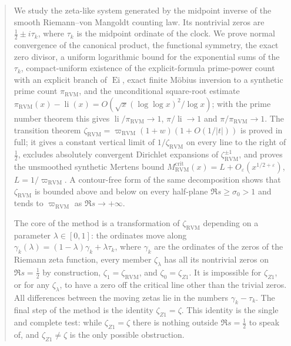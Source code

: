 \documentclass[11pt,reqno]{amsart}
\numberwithin{equation}{section}
\theoremstyle{plain}
\theoremstyle{definition}
\theoremstyle{remark}
\newcommand{\eps}{\varepsilon}
\newcommand{\li}{\operatorname{li}}
\newcommand{\Ei}{\operatorname{Ei}}
\newcommand{\RVM}{\mathrm{RVM}}
\newcommand{\crit}{\mathrm{crit}}
\begin{document}
\begin{abstract}
We study the zeta-like system generated by the midpoint inverse of the smooth Riemann--von Mangoldt counting law.  Its nontrivial zeros are $\tfrac12\pm i\tau_k$, where $\tau_k$ is the midpoint ordinate of the clock.  We prove normal convergence of the canonical product, the functional symmetry, the exact zero divisor, a uniform logarithmic bound for the exponential sums of the $\tau_k$, compact-uniform existence of the explicit-formula prime-power count with an explicit branch of $\Ei$, exact finite M\"obius inversion to a synthetic prime count $\pi_{\RVM}$, and the unconditional square-root estimate $\pi_{\RVM}(x)-\li(x)=O(\sqrt x(\log\log x)^2/\log x)$; with the prime number theorem this gives $\li/\pi_{\RVM}\to1$, $\pi/\li\to1$ and $\pi/\pi_{\RVM}\to1$.  The transition theorem $\zeta_{\RVM}=\varpi_{\RVM}(1+w)(1+O(1/|t|))$ is proved in full; it gives a constant vertical limit of $1/\zeta_{\RVM}$ on every line to the right of $\tfrac12$, excludes absolutely convergent Dirichlet expansions of $\zeta_{\RVM}^{\pm1}$, and proves the unsmoothed synthetic Mertens bound $M_{\RVM}^{\crit}(x)=L+O_\eps(x^{1/2+\eps})$, $L=1/\varpi_{\RVM}$.  A contour-free form of the same decomposition shows that $\zeta_{\RVM}$ is bounded above and below on every half-plane $\Re s\ge\sigma_0>1$ and tends to $\varpi_{\RVM}$ as $\Re s\to+\infty$.

The core of the method is a transformation of $\zeta_{\RVM}$ depending on a parameter $\lambda\in[0,1]$: the ordinates move along $\gamma_k(\lambda)=(1-\lambda)\gamma_k+\lambda\tau_k$, where $\gamma_k$ are the ordinates of the zeros of the Riemann zeta function, every member $\zeta_\lambda$ has all its nontrivial zeros on $\Re s=\tfrac12$ by construction, $\zeta_1=\zeta_{\RVM}$, and $\zeta_0=\zeta_{Z1}$.  It is impossible for $\zeta_{Z1}$, or for any $\zeta_\lambda$, to have a zero off the critical line other than the trivial zeros.  All differences between the moving zetas lie in the numbers $\gamma_k-\tau_k$.  The final step of the method is the identity $\zeta_{Z1}=\zeta$.  This identity is the single and complete test: while $\zeta_{Z1}=\zeta$ there is nothing outside $\Re s=\tfrac12$ to speak of, and $\zeta_{Z1}\neq\zeta$ is the only possible obstruction.


\end{abstract}
\end{document}
